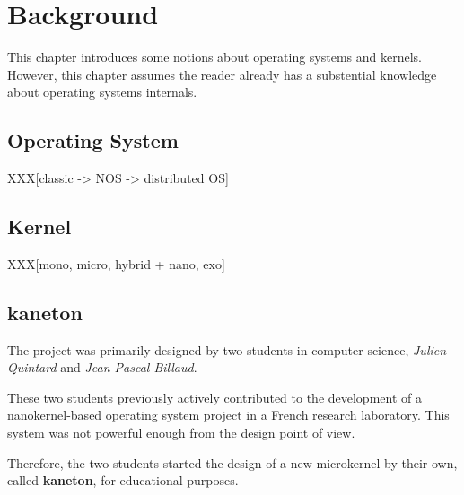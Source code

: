 %
%
%
%
%
%

%
%

\chapter{Background}
\label{chapter:background}

This chapter introduces some notions about operating systems and kernels.
However, this chapter assumes the reader already has a substential knowledge
about operating systems internals.

\newpage

%
%

%
%

\section{Operating System}

XXX[classic -> NOS -> distributed OS]

%
%

\section{Kernel}

XXX[mono, micro, hybrid + nano, exo]

%
%

\section{kaneton}

The project was primarily designed by two students in computer science,
\textit{Julien Quintard} and \textit{Jean-Pascal Billaud}.

These two students previously actively contributed to the development
of a nanokernel-based operating system project in a French research laboratory.
This system was not powerful enough from the design point of view.

Therefore, the two students started the design of a new microkernel
by their own, called \textbf{kaneton}, for educational purposes.


